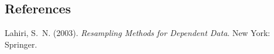 \documentclass[12pt]{article}
\begin{document}
%        
%
%        

\subsection*{References}

\begin{description}

\item
Lahiri, S.~N. (2003).
\textit{Resampling Methods for Dependent Data}.
New York: Springer.

\end{description}
\end{document}
